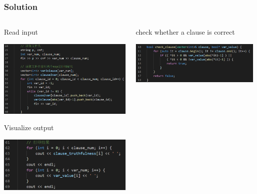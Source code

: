 \documentclass{beamer}
\begin{document}
\begin{frame}
  \frametitle{Solution}
  \begin{columns}
    \begin{column}{.5\linewidth}
      Read input
      
      \includegraphics[width=1.0\textwidth]{Pic/read-input}

      Visualize output
      
      \includegraphics[width=1.0\textwidth]{Pic/visualize-output}
    \end{column}
    \begin{column}{.5\linewidth}
      check whether a clause is correct
      
      \includegraphics[width=1.0\textwidth]{Pic/check-clause}
    \end{column}
  \end{columns}

\end{frame}
\end{document}
